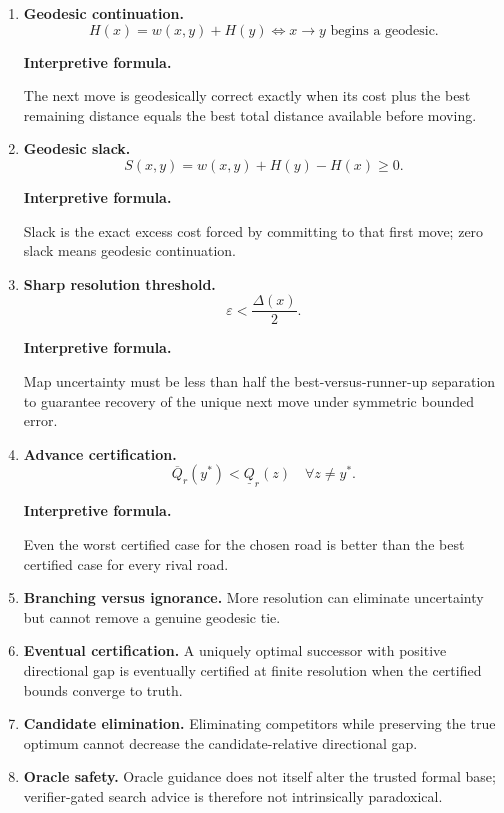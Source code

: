 \documentclass[11pt]{article}
\theoremstyle{definition}
\theoremstyle{remark}
\newcommand{\Qval}{Q}
\newcommand{\Gap}{\Delta}
\newcommand{\Slack}{S}
\newcommand{\eps}{\varepsilon}
\newenvironment{interpretiveformula}{%
  \begin{center}\begin{minipage}{0.92\linewidth}\small
  \textbf{Interpretive formula.}\ \raggedright}{\end{minipage}\end{center}}
\begin{document}
\begin{enumerate}
\item \textbf{Geodesic continuation.}
\[
H(x)=w(x,y)+H(y)
\iff
x\to y\text{ begins a geodesic.}
\]
\begin{interpretiveformula}
The next move is geodesically correct exactly when its cost plus the best remaining distance equals the best total distance available before moving.
\end{interpretiveformula}

\item \textbf{Geodesic slack.}
\[
\Slack(x,y)=w(x,y)+H(y)-H(x)\ge0.
\]
\begin{interpretiveformula}
Slack is the exact excess cost forced by committing to that first move; zero slack means geodesic continuation.
\end{interpretiveformula}

\item \textbf{Sharp resolution threshold.}
\[
\eps<\frac{\Gap(x)}2.
\]
\begin{interpretiveformula}
Map uncertainty must be less than half the best-versus-runner-up separation to guarantee recovery of the unique next move under symmetric bounded error.
\end{interpretiveformula}

\item \textbf{Advance certification.}
\[
\overline{\Qval}_r(y^*)<\underline{\Qval}_r(z)\quad\forall z\neq y^*.
\]
\begin{interpretiveformula}
Even the worst certified case for the chosen road is better than the best certified case for every rival road.
\end{interpretiveformula}

\item \textbf{Branching versus ignorance.}
More resolution can eliminate uncertainty but cannot remove a genuine geodesic tie.

\item \textbf{Eventual certification.}
A uniquely optimal successor with positive directional gap is eventually certified at finite resolution when the certified bounds converge to truth.

\item \textbf{Candidate elimination.}
Eliminating competitors while preserving the true optimum cannot decrease the candidate-relative directional gap.

\item \textbf{Oracle safety.} Oracle guidance does not itself alter the trusted formal base; verifier-gated search advice is therefore not intrinsically paradoxical.
\end{enumerate}
\end{document}
